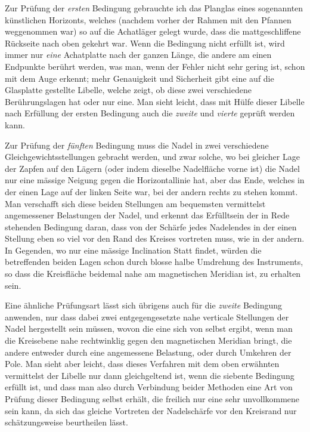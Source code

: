 \par\clearpage
{}
Zur Prüfung der \textit{ersten} Bedingung gebrauchte ich das Planglas eines sogenannten künstlichen Horizonts, welches (nachdem vorher der Rahmen mit den Pfannen weggenommen war) so auf die Achatläger gelegt wurde, dass die mattgeschliffene Rückseite nach oben gekehrt war. Wenn die Bedingung nicht erfüllt ist, wird immer nur \textit{eine} Achatplatte nach der ganzen Länge, die andere am einen Endpunkte berührt werden, was man, wenn der Fehler nicht sehr gering ist, schon mit dem Auge erkennt; mehr Genauigkeit und Sicherheit gibt eine auf die Glasplatte gestellte Libelle, welche zeigt, ob diese zwei verschiedene Berührungslagen hat oder nur eine. Man sieht leicht, dass mit Hülfe dieser Libelle nach Erfüllung der ersten Bedingung auch die \textit{zweite} und \textit{vierte} geprüft werden kann.

Zur Prüfung der \textit{fünften} Bedingung muss die Nadel in zwei verschiedene Gleichgewichtsstellungen gebracht werden, und zwar solche, wo bei gleicher Lage der Zapfen auf den Lägern (oder indem dieselbe Nadelfläche vorne ist) die Nadel nur eine mässige Neigung gegen die Horizontallinie hat, aber das Ende, welches in der einen Lage auf der linken Seite war, bei der andern rechts zu stehen kommt. Man verschafft sich diese beiden Stellungen am bequemsten vermittelst angemessener Belastungen der Nadel, und erkennt das Erfülltsein der in Rede stehenden Bedingung daran, dass von der Schärfe jedes Nadelendes in der einen Stellung eben so viel vor den Rand des Kreises vortreten muss, wie in der andern. In Gegenden, wo nur eine mässige Inclination Statt findet, würden die betreffenden beiden Lagen schon durch blosse halbe Umdrehung des Instruments, so dass die Kreisfläche beidemal nahe am magnetischen Meridian ist, zu erhalten sein.

Eine ähnliche Prüfungsart lässt sich übrigens auch für die \textit{zweite} Bedingung anwenden, nur dass dabei zwei entgegengesetzte nahe verticale Stellungen der Nadel hergestellt sein müssen, wovon die eine sich von selbst ergibt, wenn man die Kreisebene nahe rechtwinklig gegen den magnetischen Meridian bringt, die andere entweder durch eine angemessene Belastung, oder durch Umkehren der Pole. Man sieht aber leicht, dass dieses Verfahren mit dem oben erwähnten vermittelst der Libelle nur dann gleichgeltend ist, wenn die siebente Bedingung erfüllt ist, und dass man also durch Verbindung beider Methoden eine Art von Prüfung dieser Bedingung selbst erhält, die freilich nur eine sehr unvollkommene sein kann, da sich das gleiche Vortreten der Nadelschärfe vor den Kreisrand nur schätzungsweise beurtheilen lässt.

